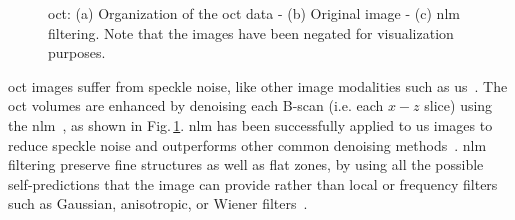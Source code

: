 \begin{figure}[t]
  \centering
  \hspace*{\fill}
   \hfill
   \hfill
  \hspace*{\fill}
  \caption{\ac{oct}: (a) Organization of the \ac{oct} data - (b) Original image - (c) \ac{nlm} filtering. Note that the images have been negated for visualization purposes.}
  \label{fig:denoise}
\end{figure}


\ac{oct} images suffer from speckle noise, like other image modalities such as \ac{us}~\cite{schmitt1999speckle}.
The \ac{oct} volumes are enhanced by denoising each B-scan (i.e. each $x-z$ slice) using the \ac{nlm}~\cite{buades2005non}, as shown in Fig.\,\ref{fig:denoise}.
\ac{nlm} has been successfully applied to \ac{us} images to reduce speckle noise and outperforms other common denoising methods~\cite{Coupe2009}.
\ac{nlm} filtering preserve fine structures as well as flat zones, by using all the possible self-predictions that the image can provide rather than local or frequency filters such as Gaussian, anisotropic, or Wiener filters~\cite{buades2005non}.

